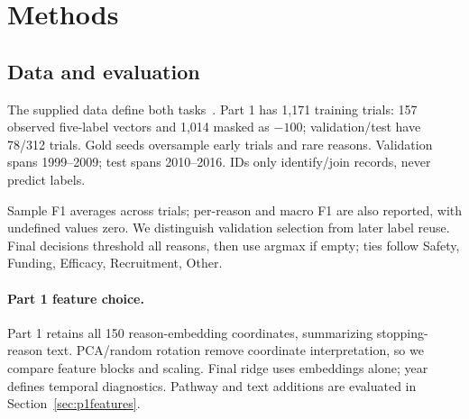 \begin{abstract}
We study scarce-label clinical-trial stopping reasons and phase-specific outcomes.
K-Means and GMM recover masked reason labels, but gains depend on the classifier and decision policy.
Calibrated RBF kernel ridge raises reported public sample F1 from 0.85405 to 0.88568;
a phase-aware text blend lowers public log loss from 0.60149 to 0.59011.
Grouped and temporal diagnostics, feature ablations, and reason-specific errors qualify these gains.
\end{abstract}
\section{Methods}
\subsection{Data and evaluation}
The supplied data define both tasks~\cite{handout}. Part 1 has 1,171 training trials:
157 observed five-label vectors and 1,014 masked as $-100$; validation/test have 78/312 trials.
Gold seeds oversample early trials and rare reasons. Validation spans 1999--2009;
test spans 2010--2016. IDs only identify/join records, never predict labels.

Sample F1 averages across trials; per-reason and macro F1 are also reported, with undefined values zero.
We distinguish validation selection from later label reuse. Final decisions threshold all reasons,
then use argmax if empty; ties follow Safety, Funding, Efficacy, Recruitment, Other.

\paragraph{Part 1 feature choice.}
Part 1 retains all 150 reason-embedding coordinates, summarizing stopping-reason text.
PCA/random rotation remove coordinate interpretation, so we compare feature blocks and scaling.
Final ridge uses embeddings alone; year defines temporal diagnostics.
Pathway and text additions are evaluated in Section~\ref{sec:p1features}.

